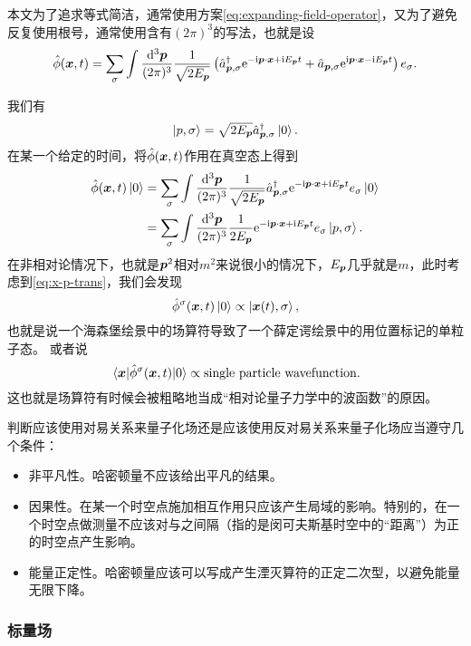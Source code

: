 \documentclass[hyperref, UTF8, a4paper]{ctexart}
\newcommand*{\ii}{\mathrm{i}}
\newcommand*{\ee}{\mathrm{e}}
\begin{document}
本文为了追求等式简洁，通常使用方案\eqref{eq:expanding-field-operator}，又为了避免反复使用根号，通常使用含有$(2\pi)^3$的写法，也就是设
\begin{equation}
    \hat{\phi}(\vb*{x}, t) = \sum_\sigma \int \frac{\dd[3]{\vb*{p}}}{(2\pi)^3} \frac{1}{\sqrt{2 E_{\vb*{p}}}} \left( \hat{a}^\dagger_{\vb*{p}, \sigma} \ee^{- \ii \vb*{p} \cdot \vb*{x} + \ii E_{\vb*{p}} t} + \hat{a}_{\vb*{p}, \sigma} \ee^{\ii \vb*{p} \cdot \vb*{x} - \ii E_{\vb*{p}} t} \right) e_\sigma. 
    \label{eq:field-operator-fourier}
\end{equation}

我们有
\[
    \ket{p, \sigma} = \sqrt{2 E_{\vb*{p}}} \hat{a}^\dagger_{\vb*{p}, \sigma} \ket{0}.
\]
在某一个给定的时间，将$\hat{\phi}(\vb*{x}, t)$作用在真空态上得到
\[
    \begin{aligned}
        \hat{\phi}(\vb*{x}, t) \ket{0} &= \sum_\sigma \int \frac{\dd[3]{\vb*{p}}}{(2\pi)^3} \frac{1}{\sqrt{2 E_{\vb*{p}}}} \hat{a}^\dagger_{\vb*{p}, \sigma} \ee^{- \ii \vb*{p} \cdot \vb*{x} + \ii E_{\vb*{p}} t} e_{\sigma} \ket{0} \\
        &= \sum_\sigma \int \frac{\dd[3]{\vb*{p}}}{(2\pi)^3} \frac{1}{2 E_{\vb*{p}}} \ee^{- \ii \vb*{p} \cdot \vb*{x} + \ii E_{\vb*{p}} t} e_{\sigma} \ket{p, \sigma}.
    \end{aligned}
\]
在非相对论情况下，也就是$\vb*{p}^2$相对$m^2$来说很小的情况下，$E_{\vb*{p}}$几乎就是$m$，此时考虑到\eqref{eq:x-p-trans}，我们会发现
\[
    \hat{\phi}^\sigma (\vb*{x}, t) \ket{0} \propto \ket{\vb*{x}(t), \sigma},
\]
也就是说一个海森堡绘景中的场算符导致了一个薛定谔绘景中的用位置标记的单粒子态。
或者说
\[
    \mel{\vb*{x}}{\hat{\phi}^\sigma (\vb*{x}, t)}{0} \propto \text{single particle wavefunction}.
\]
这也就是场算符有时候会被粗略地当成“相对论量子力学中的波函数”的原因。

判断应该使用对易关系来量子化场还是应该使用反对易关系来量子化场应当遵守几个条件：
\begin{itemize}
    \item 非平凡性。哈密顿量不应该给出平凡的结果。
    \item 因果性。在某一个时空点施加相互作用只应该产生局域的影响。特别的，在一个时空点做测量不应该对与之间隔（指的是闵可夫斯基时空中的“距离”）为正的时空点产生影响。
    \item 能量正定性。哈密顿量应该可以写成产生湮灭算符的正定二次型，以避免能量无限下降。
\end{itemize}

\subsubsection{标量场}
\end{document}
